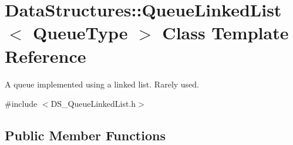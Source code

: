 \hypertarget{class_data_structures_1_1_queue_linked_list}{\section{Data\-Structures\-:\-:Queue\-Linked\-List$<$ Queue\-Type $>$ Class Template Reference}
\label{class_data_structures_1_1_queue_linked_list}
}


A queue implemented using a linked list. Rarely used.  




{\ttfamily \#include $<$D\-S\-\_\-\-Queue\-Linked\-List.\-h$>$}

\subsection*{Public Member Functions}
